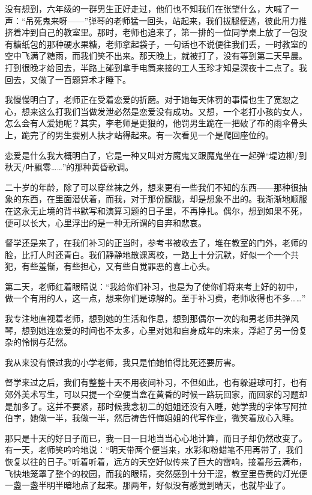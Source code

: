\par 没有想到，六年级的一群男生正好走过，他们也不知我们在张望什么，大喊了一声：“吊死鬼来呀——”弹琴的老师猛一回头，站起来，我们拔腿便逃，彼此用力推挤着冲到自己的教室里。那时，老师也追来了，第一排的一位同学桌上放了一包没有糖纸包的那种硬水果糖，老师拿起袋子，一句话也不说便往我们丢，一时教室的空中飞满了糖雨，而我们笑不出来。那天晚上，就被打了，没有等到第二天早晨。打到很晚才给回去，半路上碰到拿手电筒来接的工人玉珍才知是深夜十二点了。我回去，又做了一百题算术才睡下。
\par 我慢慢明白了，老师正在受着恋爱的折磨。对于她每天体罚的事情也生了宽恕之心，想来这么打我们当做发泄必然是恋爱没有成功。又想，一个老打小孩的女人，怎么会有人爱她呢？其实，李老师是更狠的，他罚男生跪在一把破了布的雨伞骨头上，跪完了的男生要别人扶才站得起来。有一次看见一个是爬回座位的。
\par 恋爱是什么我大概明白了，它是一种又叫对方魔鬼又跟魔鬼坐在一起弹“堤边柳/到秋天/叶飘零……”的那种黄昏歌调。
\par 二十岁的年龄，除了可以穿丝袜之外，想来更有一些我们不知的东西——那种很抽象的东西，在里面潜伏着，而我，对于那份朦胧，却是想象不出的。我渐渐地顺服在这永无止境的背书默写和演算习题的日子里，不再挣扎。偶尔，想到如果不死，便可以长大，心里浮出的是一种无所谓的自弃和悲哀。
\par 督学还是来了，在我们补习的正当时，参考书被收去了，堆在教室的门外，老师的脸，比打人时还青白。我们静静地散课离校，一路上十分沉默，好似一个一个共犯，有些羞惭，有些担心，又有些自觉罪恶的喜上心头。
\par 第二天，老师红着眼睛说：“我给你们补习，也是为了使你们将来考上好的初中，做一个有用的人，这一点，想来你们是谅解的。至于补习费，老师收得也不多……”
\par 我专注地直视着老师，想到她的生活和作息，想到那偶尔一次的和男老师共弹风琴，想到她连恋爱的时间也不太多，心里对她和自身成年的未来，浮起了另一份复杂的怜悯与茫然。
\par 我从来没有恨过我的小学老师，我只是怕她怕得比死还要厉害。
\par 督学来过之后，我们有整整十天不用夜间补习，不但如此，也有躲避球可打，也有郊外美术写生，可以只提一个空便当盒在黄昏的时候一路玩回家，而回家的习题却是加多了。这并不要紧，那时候我念初二的姐姐还没有入睡，她学我的字体写阿拉伯字，她做一半，我做一半，然后祷告忏悔姐姐的代写作业，微笑着放心入睡。
\par 那只是十天的好日子而已，我一日一日地当当心心地计算，而日子却仍然改变了。有一天，老师笑吟吟地说：“明天带两个便当来，水彩和粉蜡笔不用再带了，我们恢复以往的日子。”听着听着，远方的天空好似传来了巨大的雷响，接着彤云满布，飞快地笼罩了整个的校园，而我的眼睛，突然感到十分干涩，教室里昏黄的灯光便一盏一盏半明半暗地点了起来。那两年，好似没有感觉到晴天，也就毕业了。
